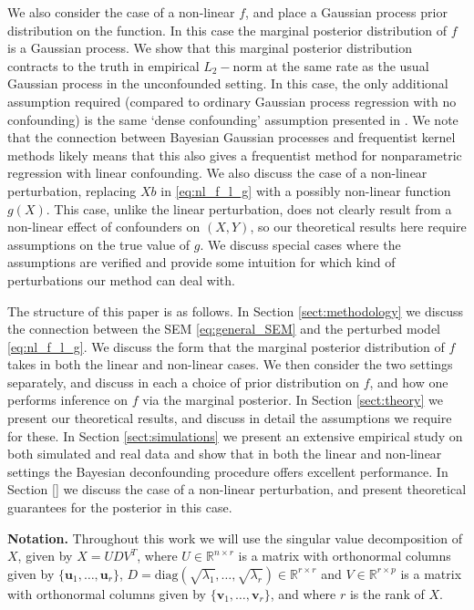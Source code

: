 \documentclass[11pt]{article}
\newcommand{\R}{\mathbb{R}}
\newcommand{\diag}{\textrm{diag}}
\begin{document}
We also consider the case of a non-linear $f$, and place a Gaussian process prior distribution on the function. In this case the marginal posterior distribution of $f$ is a Gaussian process. We show that this marginal posterior distribution contracts to the truth in empirical $L_2-$norm at the same rate as the usual Gaussian process in the unconfounded setting. In this case, the only additional assumption required (compared to ordinary Gaussian process regression with no confounding) is the same `dense confounding' assumption presented in \cite{CBM2020}. We note that the connection between Bayesian Gaussian processes and frequentist kernel methods likely means that this also gives a frequentist method for nonparametric regression with linear confounding. We also discuss the case of a non-linear perturbation, replacing $Xb$ in \eqref{eq:nl_f_l_g} with a possibly non-linear function $g(X)$. This case, unlike the linear perturbation, does not clearly result from a non-linear effect of confounders on $(X, Y)$, so our theoretical results  here require assumptions on the true value of $g$. We discuss special cases where the assumptions are verified and provide some intuition for which kind of perturbations our method can deal with.

The structure of this paper is as follows. In Section \ref{sect:methodology} we discuss the connection between the SEM \eqref{eq:general_SEM} and the perturbed model \eqref{eq:nl_f_l_g}. We discuss the form that the marginal posterior distribution of $f$ takes in both the linear and non-linear cases. We then consider the two settings separately, and discuss in each a choice of prior distribution on $f$, and how one performs inference on $f$ via the marginal posterior. In Section \ref{sect:theory} we present our theoretical results, and discuss in detail the assumptions we require for these. In Section \ref{sect:simulations} we present an extensive empirical study on both simulated and real data and show that in both the linear and non-linear settings the Bayesian deconfounding procedure offers excellent performance. In Section \ref{} we discuss the case of a non-linear perturbation, and present theoretical guarantees for the posterior in this case.

{\bf Notation. } Throughout this work we will use the singular value decomposition of $X$, given by $X = UDV^T$, where $U \in \R^{n \times r}$ is a matrix with orthonormal columns given by $\{\mathbf{u}_1, \dots, \mathbf{u}_r\}$, $D = \diag(\sqrt{\lambda_1}, \dots, \sqrt{\lambda_r}) \in \R^{r \times r}$ and $V \in \R^{r \times p}$ is a matrix with orthonormal columns given by $\{\mathbf{v}_1, \dots, \mathbf{v}_r\}$, and where $r$ is the rank of $X$.
\end{document}

